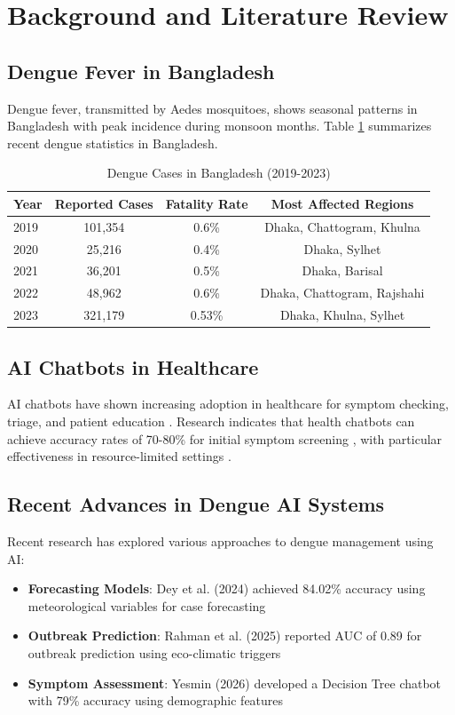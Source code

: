 \documentclass[conference]{IEEEtran}
\begin{document}
\section{Background and Literature Review}

\subsection{Dengue Fever in Bangladesh}
Dengue fever, transmitted by Aedes mosquitoes, shows seasonal patterns in Bangladesh with peak incidence during monsoon months. Table \ref{tab:dengue_cases} summarizes recent dengue statistics in Bangladesh.

\begin{table}[h]
\centering
\caption{Dengue Cases in Bangladesh (2019-2023)}
\label{tab:dengue_cases}
\begin{tabular}{@{}lccc@{}}
\toprule
\textbf{Year} & \textbf{Reported Cases} & \textbf{Fatality Rate} & \textbf{Most Affected Regions} \\
\midrule
2019 & 101,354 & 0.6\% & Dhaka, Chattogram, Khulna \\
2020 & 25,216 & 0.4\% & Dhaka, Sylhet \\
2021 & 36,201 & 0.5\% & Dhaka, Barisal \\
2022 & 48,962 & 0.6\% & Dhaka, Chattogram, Rajshahi \\
2023 & 321,179 & 0.53\% & Dhaka, Khulna, Sylhet \\
\bottomrule
\end{tabular}
\end{table}

\subsection{AI Chatbots in Healthcare}
AI chatbots have shown increasing adoption in healthcare for symptom checking, triage, and patient education \cite{clark2024}. Research indicates that health chatbots can achieve accuracy rates of 70-80\% for initial symptom screening \cite{xu2022}, with particular effectiveness in resource-limited settings \cite{bagliyo2023}.

\subsection{Recent Advances in Dengue AI Systems}
Recent research has explored various approaches to dengue management using AI:

\begin{itemize}
\item \textbf{Forecasting Models}: Dey et al. (2024) achieved 84.02\% accuracy using meteorological variables for case forecasting \cite{dey2024}
\item \textbf{Outbreak Prediction}: Rahman et al. (2025) reported AUC of 0.89 for outbreak prediction using eco-climatic triggers \cite{rahman2025}
\item \textbf{Symptom Assessment}: Yesmin (2026) developed a Decision Tree chatbot with 79\% accuracy using demographic features \cite{yesmin2026}
\end{itemize}
\end{document}
